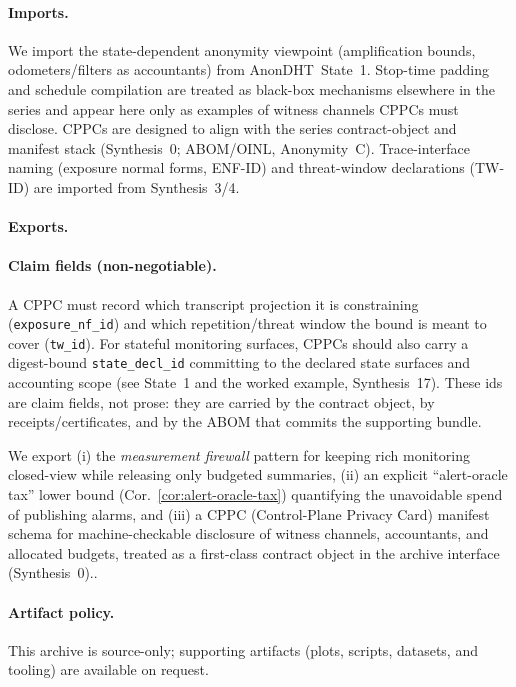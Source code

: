 \documentclass[11pt]{article}
\begin{document}
\paragraph{Imports.}
We import the state-dependent anonymity viewpoint (amplification bounds, odometers/filters as accountants) from AnonDHT~State~1.\cite{series:state1}
Stop-time padding and schedule compilation are treated as black-box mechanisms elsewhere in the series and appear here only as examples of witness channels CPPCs must disclose.\cite{series:stoptimeaddendum,series:schedcompiler}
CPPCs are designed to align with the series contract-object and manifest stack (Synthesis~0; ABOM/OINL, Anonymity~C).\cite{series:contractobjects,series:abomoinl}
Trace-interface naming (exposure normal forms, ENF-ID) and threat-window declarations (TW-ID) are imported from Synthesis~3/4.\cite{series:traceifaces,series:threatwindows}

\paragraph{Exports.}

\paragraph{Claim fields (non-negotiable).}
A CPPC must record which transcript projection it is constraining (\texttt{exposure\_nf\_id}) and which repetition/threat window the bound is meant to cover (\texttt{tw\_id}). For stateful monitoring surfaces, CPPCs should also carry a digest-bound \texttt{state\_decl\_id} committing to the declared state surfaces and accounting scope (see State~1 and the worked example, Synthesis~17).
These ids are claim fields, not prose: they are carried by the contract object, by receipts/certificates, and by the ABOM that commits the supporting bundle.


We export (i) the \emph{measurement firewall} pattern for keeping rich monitoring closed-view while releasing only budgeted summaries, (ii) an explicit ``alert-oracle tax'' lower bound (Cor.~\ref{cor:alert-oracle-tax}) quantifying the unavoidable spend of publishing alarms, and (iii) a CPPC (Control-Plane Privacy Card) manifest schema for machine-checkable disclosure of witness channels, accountants, and allocated budgets, treated as a first-class contract object in the archive interface (Synthesis~0).\cite{series:contractobjects}.

\paragraph{Artifact policy.}
This archive is source-only; supporting artifacts (plots, scripts, datasets, and tooling) are available on request.\cite{series:artifactpolicy}
\end{document}
